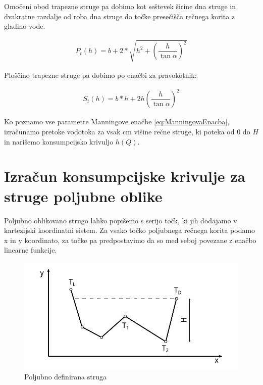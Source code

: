 \begin{enumerate}
	Omočeni obod trapezne struge pa dobimo kot seštevek širine dna struge in dvakratne razdalje od roba dna struge do točke presečišča rečnega korita z gladino vode.
	
	\begin{ceqn}
	\begin{align}
	P_{t}(h) = b + 2 * \sqrt{h^2 + \left(\dfrac{h} {\tan\alpha} \right)^{2}}
	\end{align}
	\end{ceqn}
	
	Ploščino trapezne struge pa dobimo po enačbi za pravokotnik:
	\begin{ceqn}
	\begin{align}
	S_{t}(h) = b * h + 2 h \left( \dfrac{h}{ \tan\alpha} \right) ^ {2}
	\end{align}
	\end{ceqn}
	
\end{enumerate}



Ko poznamo vse parametre Manningove enačbe \ref{eq:ManningovaEnacba}, izračunamo pretoke vodotoka za vsak cm višine rečne struge, ki poteka od 0 do $H$ in narišemo konsumpcijsko krivuljo $h(Q)$.


\newpage
\section{Izračun konsumpcijske krivulje za struge poljubne oblike}\label{sec:pretokNumericnaMetoda}


Poljubno oblikovano strugo lahko popišemo s serijo točk, ki jih dodajamo v kartezijski koordinatni sistem. Za vsako točko poljubnega rečnega korita podamo x in y koordinato, za točke pa predpostavimo da so med seboj povezane z enačbo linearne funkcije. 

\begin{figure}[ht!]
	\begin{centering}
		\includegraphics{slike/customChannel/customStruga.pdf}		
		\caption{Poljubno definirana struga}\label{fig:poljubnaStruga}
	\end{centering}
\end{figure}



